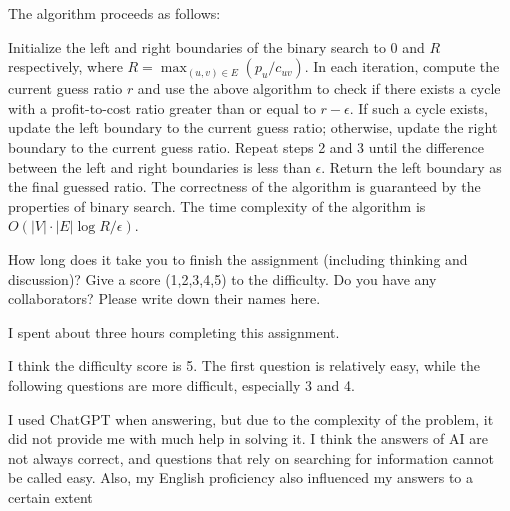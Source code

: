 \documentclass{oxmathproblems}
\begin{document}
\begin{questions}
\begin{parts}
    The algorithm proceeds as follows:
    
    Initialize the left and right boundaries of the binary search to 0 and $R$ respectively, where $R=\max_{(u,v)\in E}(p_u/c_{uv})$.
    In each iteration, compute the current guess ratio $r$ and use the above algorithm to check if there exists a cycle with a profit-to-cost ratio greater than or equal to $r-\epsilon$.
    If such a cycle exists, update the left boundary to the current guess ratio; otherwise, update the right boundary to the current guess ratio.
    Repeat steps 2 and 3 until the difference between the left and right boundaries is less than $\epsilon$.
    Return the left boundary as the final guessed ratio.
    The correctness of the algorithm is guaranteed by the properties of binary search. The time complexity of the algorithm is $O(|V|\cdot|E| \log R / \epsilon)$.
\end{parts}
  
\miquestion
How long does it take you to finish the assignment (including thinking and discussion)?
Give a score (1,2,3,4,5) to the difficulty.
Do you have any collaborators?
Please write down their names here.
 
I spent about three hours completing this assignment.

I think the difficulty score is 5. The first question is relatively easy, while the following questions are more difficult, especially 3 and 4.

I used ChatGPT when answering, but due to the complexity of the problem, it did not provide me with much help in solving it. I think the answers of AI are not always correct, and questions that rely on searching for information cannot be called easy. Also, my English proficiency also influenced my answers to a certain extent

\end{questions}
\end{document}

